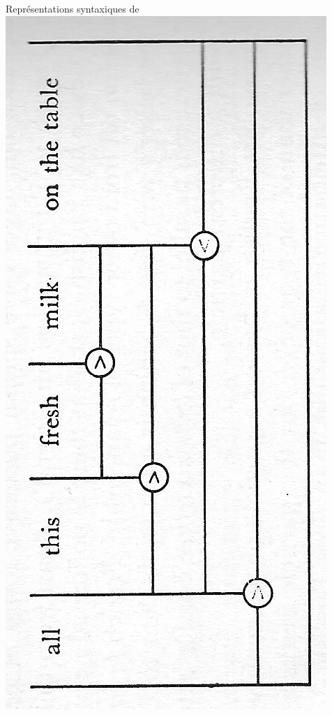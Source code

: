 {    Représentations syntaxiques de \citealt{Hockett1958}
    \includegraphics[width=\textwidth]{figures/vol1syntaxe2-img025.png}

}
